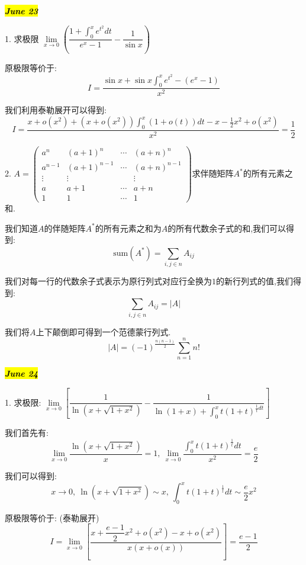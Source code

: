 \hl{\textbf{\textit{June 23}}}

1. 求极限 $\lim\limits_{x\rightarrow 0}\left( \dfrac{1+\int_{0}^{x}e^{t^2}dt}{e^x-1}-\dfrac{1}{\sin x}\right) $
\begin{solution}
	
	原极限等价于: 
	$$I=\dfrac{\sin x+\sin x\int_{0}^{x}e^{t^2}-(e^x-1)}{x^2}$$
	
	我们利用泰勒展开可以得到: 
	$$I=\dfrac{x+o(x^2)+(x+o(x^2))\int_{0}^{x}(1+o(t))dt-x-\frac{1}{2}x^2+o(x^2)}{x^2}=\dfrac{1}{2}$$
\end{solution}

2. $A=\left( \begin{matrix}
	a^n&(a+1)^n&\cdots&(a+n)^n\\
	a^{n-1}&(a+1)^{n-1}&\cdots&(a+n)^{n-1}\\
	\vdots&\vdots& &\vdots\\
	a&a+1&\cdots&a+n\\
	1&1&\cdots&1
\end{matrix}\right) $\quad 求伴随矩阵$A^{*}$的所有元素之和.
\begin{solution}
	
	我们知道$A$的伴随矩阵$A^{*}$的所有元素之和为$A$的所有代数余子式的和,我们可以得到: 
	$$\text{sum}(A^{*})=\sum\limits_{i,j\in n}A_{ij}$$
	
	我们对每一行的代数余子式表示为原行列式对应行全换为$1$的新行列式的值,我们得到: 
	$$\sum\limits_{i,j\in n}A_{ij}=|A|$$
	
	我们将$A$上下颠倒即可得到一个范德蒙行列式.
	$$|A|=(-1)^{\frac{n(n-1)}{2}}\sum\limits_{n=1}^{n}n!$$
\end{solution}

\hl{\textbf{\textit{June 24}}}

1. 求极限: $\lim\limits_{x\rightarrow 0}\left[ \dfrac{1}{\ln(x+\sqrt{1+x^2})}-\dfrac{1}{\ln(1+x)+\int_{0}^{x}t(1+t)^{\frac{1}{t}dt}}\right]$
\begin{solution}
	
	我们首先有: 
	$$\lim\limits_{x\rightarrow 0}\dfrac{\ln(x+\sqrt{1+x^2})}{x}=1,\ \lim\limits_{x\rightarrow 0}\dfrac{\int_{0}^{x}t(1+t)^{\frac{1}{t}}dt}{x^2}=\frac{e}{2}$$
	
	我们可以得到: 
	$$x\rightarrow 0,\ \ln(x+\sqrt{1+x^2})\sim x,\ \int_{0}^{x}t(1+t)^{\frac{1}{t}}dt\sim \dfrac{e}{2}x^2$$
	
	原极限等价于: (泰勒展开)
	$$I=\lim\limits_{x\rightarrow 0}\left[ \dfrac{x+\dfrac{e-1}{2}x^2+o(x^2)-x+o(x^2)}{x(x+o(x))}\right]=\dfrac{e-1}{2}$$
\end{solution}

